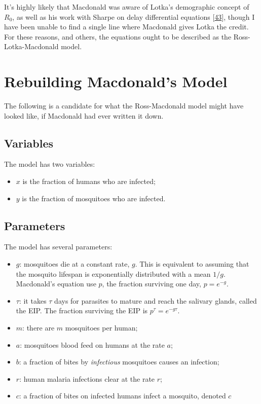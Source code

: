 \documentclass[
]{book}
\begin{document}
It's highly likely that Macdonald was aware of Lotka's demographic concept of \(R_0\), as well as his work with Sharpe on delay differential equations {[}\protect\hyperlink{ref-LotkaAJ1923part4}{43}{]}, though I have been unable to find a single line where Macdonald gives Lotka the credit. For these reasons, and others, the equations ought to be described as the Ross-Lotka-Macdonald model.

\hypertarget{rebuilding-macdonalds-model}{%
\section{Rebuilding Macdonald's Model}\label{rebuilding-macdonalds-model}}

The following is a candidate for what the Ross-Macdonald model might have looked like, if Macdonald had ever written it down.

\hypertarget{variables}{%
\subsection{Variables}\label{variables}}

The model has two variables:

\begin{itemize}
\item
  \(x\) is the fraction of humans who are infected;
\item
  \(y\) is the fraction of mosquitoes who are infected.
\end{itemize}

\hypertarget{parameters}{%
\subsection{Parameters}\label{parameters}}

The model has several parameters:

\begin{itemize}
\item
  \(g\): mosquitoes die at a constant rate, \(g\). This is equivalent to assuming that the mosquito lifespan is exponentially distributed with a mean \(1/g\). Macdonald's equation use \(p\), the fraction surviving one day, \(p = e^{-g}\).
\item
  \(\tau\): it takes \(\tau\) days for parasites to mature and reach the salivary glands, called the EIP. The fraction surviving the EIP is \(p^\tau = e^{-g \tau}\).
\item
  \(m\): there are \(m\) mosquitoes per human;
\item
  \(a\): mosquitoes blood feed on humans at the rate \(a\);
\item
  \(b\): a fraction of bites by \emph{infectious} mosquitoes causes an infection;
\item
  \(r\): human malaria infections clear at the rate \(r\);
\item
  \(c\): a fraction of bites on infected humans infect a mosquito, denoted \(c\)
\end{itemize}
\end{document}
